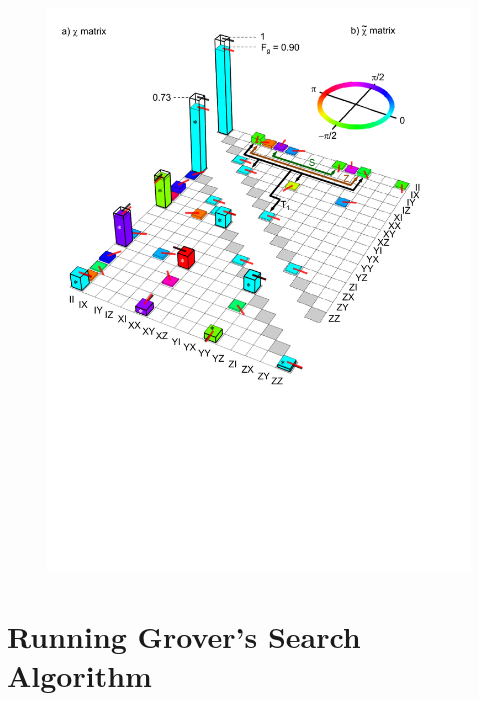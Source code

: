 \begin{figure}
	\centering
		\includegraphics[width=1.\textwidth]{./material/papers/iswap/figures/chi_matrix_and_error_process}
	\label{fig:GateChiMatrixAndErrorProcess}
	\caption{}
\end{figure}


\section{Running Grover's Search Algorithm}


